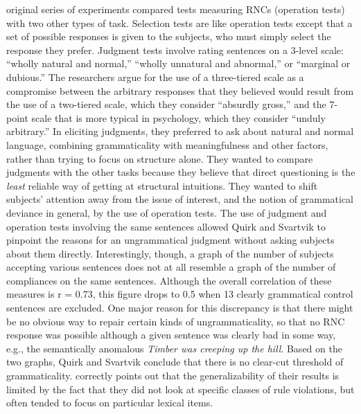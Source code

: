  original series of experiments compared tests measuring RNCs (operation tests) with two other types of task. Selection tests are like operation tests except that a set of possible responses is given to the subjects, who must simply select the response they prefer. Judgment tests involve rating sentences on a 3-level scale: ``wholly natural and normal,'' ``wholly unnatural and abnormal,'' or ``marginal or dubious.'' The researchers argue for the use of a three-tiered scale as a compromise between the arbitrary responses that they believed would result from the use of a two-tiered scale, which they consider ``absurdly gross,'' and the 7-point scale that is more typical in psychology, which they consider ``unduly arbitrary.'' In eliciting judgments, they preferred to ask about natural and normal language, combining grammaticality with meaningfulness and other factors, rather than trying to focus on structure alone. They wanted to compare judgments with the other tasks because they believe that direct questioning is the \textit{least} reliable way of getting at structural intuitions. They wanted to shift subjects' attention away from the issue of interest, and the notion of grammatical deviance in general, by the use of operation tests. The use of judgment and operation tests involving the same sentences allowed Quirk and Svartvik to pinpoint the reasons for an ungrammatical judgment without asking subjects about them directly. Interestingly, though, a graph of the number of subjects accepting various sentences does not at all resemble a graph of the number of compliances on the
same sentences. Although the overall correlation of these measures is r = 0.73, this figure drops to 0.5 when 13 clearly grammatical control sentences are excluded. One major reason for this discrepancy is that there might be no obvious way to repair certain kinds of ungrammaticality, so that no RNC response was possible although a given sentence was clearly bad in some way, e.g., the semantically anomalous \textit{Timber was creeping up the hill}. Based on the two graphs, Quirk and Svartvik conclude that there is no clear-cut threshold of grammaticality. \citet{Stolz1969} correctly points out that the generalizability of their results is limited by the fact that they did not look at specific classes of rule violations, but often tended to focus on particular lexical items.

